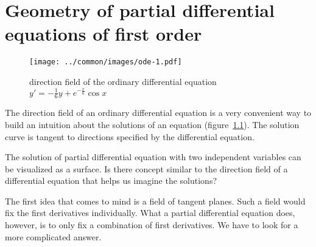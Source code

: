 %
%
%
\chapter{Geometry of partial differential equations of first order\label{chapter-geometrie}}
\begin{figure}
\begin{center}
\texttt{[image: ../common/images/ode-1.pdf]}
\end{center}
\caption{direction field of the ordinary differential equation 
$y'=-\frac16y+e^{-\frac{x}6}\cos x$ \label{geometrie:ode}}
\end{figure}
The direction field of an ordinary differential equation is a very
convenient way to build an intuition about the solutions of an equation
(figure~\ref{geometrie:ode}).
The solution curve is tangent to directions specified by the differential
equation.


The solution of partial differential equation with two independent variables
can be visualized as a surface.
Is there concept similar to the direction field of a differential equation
that helps us imagine the solutions?

The first idea that comes to mind is a field of tangent planes.
Such a field would fix the first derivatives individually.
What a partial differential equation does, however, is to only fix a
combination of first derivatives.
We have to look for a more complicated answer.






